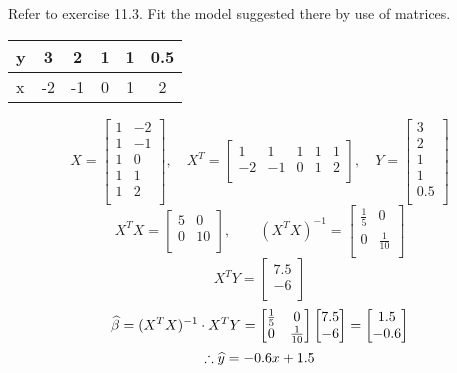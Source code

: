 Refer to exercise 11.3. Fit the model suggested there by use of matrices. 

\soln*
\begin{center}
    \begin{tabular}{l|ccccc}
         y & 3 & 2 & 1 & 1 & 0.5\\
         \hline
         x & -2 & -1 & 0 & 1 & 2\\
    \end{tabular}
\end{center}

$$
X = \begin{bmatrix}
	1 & -2\\
	1 & -1\\
	1 & 0\\
	1 & 1\\
	1 & 2\\
\end{bmatrix}
, \quad X^T =
\begin{bmatrix}
	1 & 1 & 1 & 1 & 1\\
	-2 & -1 & 0 & 1 & 2\\
\end{bmatrix}
, \quad Y=
\begin{bmatrix}
	3\\
	2\\
	1\\
	1\\
	0.5\\
\end{bmatrix}
$$
$$
X^TX = \begin{bmatrix}
	5 & 0\\
	0 & 10\\
\end{bmatrix}, \qquad (X^TX)^{-1} = \begin{bmatrix}
	\frac15 & 0\\
	0 & \frac{1}{10}\\
\end{bmatrix}
$$
$$
X^TY = \begin{bmatrix}
	7.5\\
	-6\\
\end{bmatrix}
$$
$$
\widehat{\beta} = (X^TX)^{-1}\cdot X^TY = \begin{bmatrix}
	\frac15 & 0\\
	0 & \frac{1}{10}\\
\end{bmatrix}
\begin{bmatrix}
	7.5\\
	-6\\
\end{bmatrix} = \begin{bmatrix}
	1.5\\
	-0.6\\
\end{bmatrix}
$$
$$\therefore \widehat{y} = -0.6x + 1.5$$